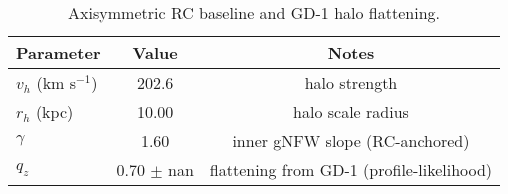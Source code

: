 
\begin{table}[t]
\centering
\caption{Axisymmetric RC baseline and GD-1 halo flattening.}
\begin{tabular}{lcc}
\hline
Parameter & Value & Notes \\
\hline
$v_h$ (km s$^{-1}$) & 202.6 & halo strength \\
$r_h$ (kpc)           & 10.00 & halo scale radius \\
$\gamma$              & 1.60 & inner gNFW slope (RC-anchored) \\
$q_z$                 & 0.70 $\pm$ nan & flattening from GD-1 (profile-likelihood) \\
\hline
\end{tabular}
\end{table}
